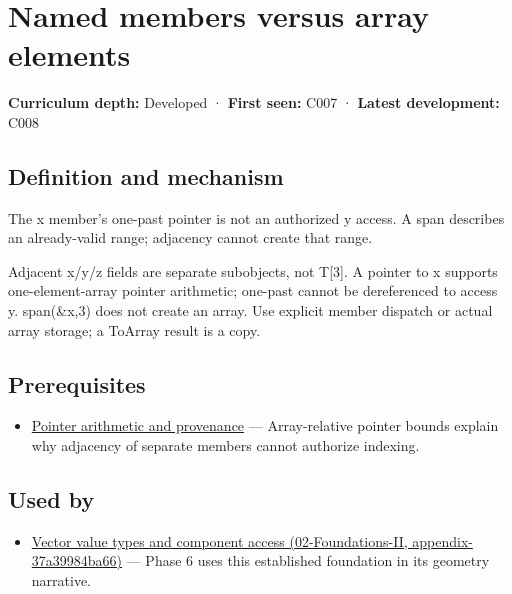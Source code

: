 \hypertarget{appendix-3f7e15effba6}{}
\section{Named members versus array elements}\label{appendix-3f7e15effba6-named-members-versus-array-elements}

\textbf{Curriculum depth:} Developed · \textbf{First seen:} C007 · \textbf{Latest development:} C008

\subsection{Definition and mechanism}\label{appendix-3f7e15effba6-definition-and-mechanism}

The x member's one-past pointer is not an authorized y access. A span describes an already-valid range; adjacency cannot create that range.

Adjacent x/y/z fields are separate subobjects, not T{[}3{]}. A pointer to x supports one-element-array pointer arithmetic; one-past cannot be dereferenced to access y. span(\&x,3) does not create an array. Use explicit member dispatch or actual array storage; a ToArray result is a copy.

\subsection{Prerequisites}\label{appendix-3f7e15effba6-prerequisites}

\begin{itemize}
\tightlist
\item
  \hyperref[appendix-6af5921bc853]{Pointer arithmetic and provenance} --- Array-relative pointer bounds explain why adjacency of separate members cannot authorize indexing.
\end{itemize}

\subsection{Used by}\label{appendix-3f7e15effba6-used-by}

\begin{itemize}
\tightlist
\item
  \href{../02-Foundations-II/main.pdf\#nameddest=appendix-37a39984ba66}{Vector value types and component access (02-Foundations-II, appendix-37a39984ba66)} --- Phase 6 uses this established foundation in its geometry narrative.
\end{itemize}

